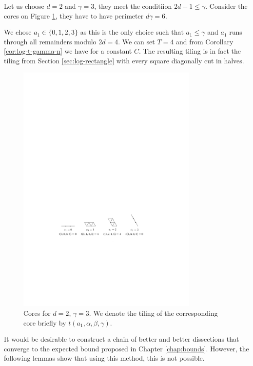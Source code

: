 \begin{exmp}
Let us choose $d=2$ and $\gamma=3$, they meet the conditiion $2d-1 \leq \gamma$. Consider the cores on Figure \ref{fig:core-kk3}, they have to have perimeter $d\gamma = 6$.

We chose $a_1 \in \{0,1,2,3\}$ as this is the only choice such that $a_1 \leq \gamma$ and $a_1$ runs through all remainders modulo $2d=4$. We can set $T=4$ and from Corollary \ref{cor:log-t-gamma-n} we have
%
for a constant $C$. The resulting tiling is in fact the tiling from Section \ref{sec:log-rectangle}  with every square diagonally cut in halves.

\begin{figure}[htb]
\centering
\includegraphics[width=0.8\textwidth]{img/example_core_kk3.pdf}
\caption{Cores for $d=2$, $\gamma=3$. We denote the tiling of the corresponding core briefly by $t(a_1,\alpha,\beta,\gamma)$.}
\label{fig:core-kk3}
\end{figure}
\end{exmp}%

It would be desirable to construct a chain of better and better dissections that converge to the expected bound proposed in Chapter \ref{chap:bounds}. However, the following lemmas show that using this method, this is not possible.

